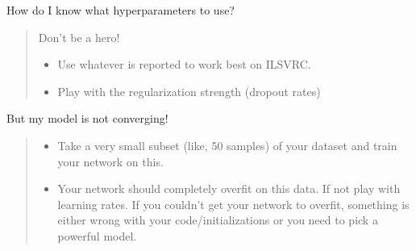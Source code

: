 \documentclass[a4paper]{tufte-handout}
\begin{document}
\noindent How do I know what hyperparameters to use?

\begin{quote}
Don't be a hero!

\begin{itemize}
\item
  Use whatever is reported to work best on ILSVRC.
\item
  Play with the regularization strength (dropout rates)
\end{itemize}
\end{quote}

\noindent But my model is not converging!

\begin{quote}
\begin{itemize}
\item
  Take a very small subset (like, 50 samples) of your dataset and train
  your network on this.
\item
  Your network should completely overfit on this data. If not play with
  learning rates. If you couldn't get your network to overfit, something
  is either wrong with your code/initializations or you need to pick a
  powerful model.
\end{itemize}
\end{quote}
\end{document}
